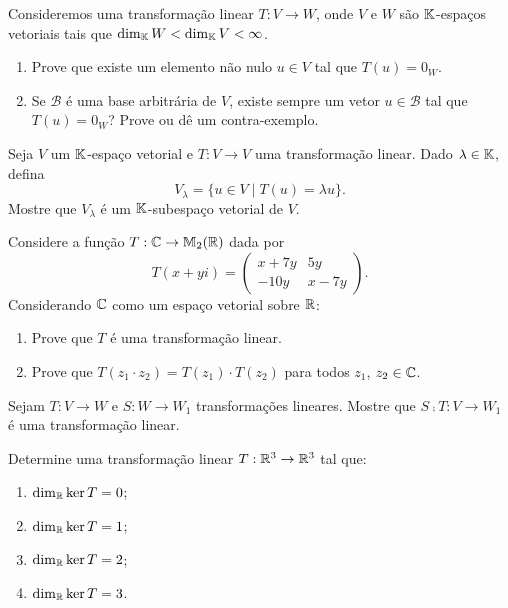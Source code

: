 \documentclass[12pt]{exam}
\begin{document}
\begin{exercicio}
	Consideremos uma transforma\c{c}\~ao linear $T : V \to W$, onde $V$ e $W$ s\~ao $\mathbb{K}$-espa\c{c}os vetoriais tais que $\dim_{\mathbb{K}}W < \dim_{\mathbb{K}}V < \infty$.
	\begin{enumerate}[label=({\alph*})]
		\item Prove que existe um elemento n\~ao nulo $u \in V$ tal que $T(u) = 0_W$.
		\item Se $\mathcal{B}$ \'e uma base arbitr\'aria de $V$, existe sempre um vetor $u \in \mathcal{B}$ tal que $T(u) = 0_W$? Prove ou d\^e um contra-exemplo.
	\end{enumerate}
\end{exercicio}


\begin{exercicio}
	Seja $V$ um $\mathbb{K}$-espa\c{c}o vetorial e $T : V \to V$ uma transforma\c{c}\~ao linear. Dado $\lambda \in \mathbb{K}$, defina
	\[
	V_\lambda = \{ u \in V \mid T(u) = \lambda u\}.
	\]
	Mostre que $V_\lambda$ \'e um $\mathbb{K}$-subespa\c{c}o vetorial de $V$.
\end{exercicio}

\begin{exercicio}
	Considere a fun\c{c}\~ao $T : \mathbb{C} \to \mathbb{M}_2(\mathbb{R})$ dada por
	\[
	T(x + yi) = \begin{pmatrix}
		x + 7y & 5y\\
		-10y & x - 7y
	\end{pmatrix}.
	\]
	Considerando $\mathbb{C}$ como um espa\c{c}o vetorial sobre $\mathbb{R}$:
	\begin{enumerate}[label=({\alph*})]
		\item Prove que $T$ \'e uma transforma\c{c}\~ao linear.
		\item Prove que $T(z_1\cdot z_2) = T(z_1)\cdot T(z_2)$ para todos $z_1$, $z_2 \in \mathbb{C}$.
	\end{enumerate}
\end{exercicio}

\begin{exercicio}
	Sejam $T : V \to W$ e $S : W \to W_1$ transforma\c{c}\~oes lineares. Mostre que $S \comp T : V \to W_1$ \'e uma transforma\c{c}\~ao linear.
\end{exercicio}

\begin{exercicio}
	Determine uma transforma\c{c}\~ao linear $T : \mathbb{R}^3 \to \mathbb{R}^3$ tal que:
	\begin{enumerate}[label=({\alph*})]
		\item $\dim_{\mathbb{R}} \ker T = 0$;
		\item $\dim_{\mathbb{R}} \ker T = 1$;
		\item $\dim_{\mathbb{R}} \ker T = 2$;
		\item $\dim_{\mathbb{R}} \ker T = 3$.
	\end{enumerate}
\end{exercicio}
\end{document}
